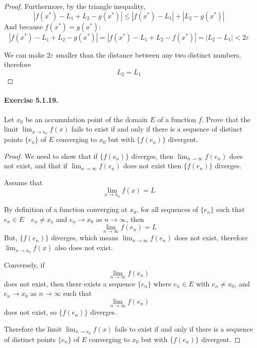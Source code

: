 \documentclass[11pt]{article}
\def \epsilon {\varepsilon}
\newcommand{\set}[1]{\{#1\}}
\def \limittoinfyn {\lim_{n \to \infty}}
\def \limitToXZero {\lim_{x \to x_0}}
\def \sn {s_n}
\def \tn {t_n}
\def \en {e_n}
\begin{document}
\begin{enumerate}[label=(\alph*)]
\begin{proof}
		Furthermore, by the triangle inequality, 
		$$|f(x^*) - L_1 + L_2 - g(x^*)| \leq |f(x^*) - L_1| + |L_2 - g(x^*)|$$
		And because $ f(x^*) = g(x^*) $:
		$$|f(x^*) - L_1 + L_2 - g(x^*)| = |f(x^*) - L_1 + L_2 - f(x^*)| = | L_2 - L_1 | < 2\epsilon$$
		
		We can make $ 2\epsilon $ smaller than the distance between any two distinct numbers, therefore $$ L_2 = L_1 $$
	
					
%		
	\end{proof}

\end{enumerate}

\paragraph{Exercise 5.1.19.} Let $x_0$ be an accumulation point of the domain $E$ of a function $f$.
Prove that the limit $\lim_{x \rightarrow x_0} f(x)$ fails to exist if and only if there is a sequence of distinct points $\{e_n\}$ of $E$ converging to $x_0$ but with $ \set{ f(\en) } $ divergent.

\begin{proof}
	
	We need to show that if $ \set{ f(\en)} $ diverges, then $\limittoinfyn f(\en)$ does not exist, and that if $\limittoinfyn f(\en)$ does not exist then $ \set{ f(\en)} $ diverges.
	
	
	Assume that $$ \limitToXZero f(x) = L $$
	
	By definition of a function converging at $ x_0 $, for all sequences of $ \set{\en} $ such that $ \en \in E \quad \en \ne x_o $ and $ \en \to x_0 $ as $ n \to \infty $, then 
		$$ \limittoinfyn f(\en) = L$$
	But, $ \set{f(\en)} $ diverges, which means $ \limittoinfyn f(\en) $ does not exist, therefore $\limitToXZero f(x)$ also does not exist.
	
	Conversely, if $$ \limittoinfyn f(\en) $$ does not exist, then there exists a sequence $ \set{\en} $ where $ \en \in E $ with $ \en \ne x_0 $, and $ \en \to x_0 $ as $ n \to \infty $ such that $$ \limittoinfyn f(\en) $$ does not exist, so $ \set{ f(\en)} $ diverges.	
	
	Therefore the limit $\lim_{x \rightarrow x_0} f(x)$ fails to exist if and only if there is a sequence of distinct points $\{e_n\}$ of $E$ converging to $x_0$ but with $ \set{ f(\en) } $ divergent.

\end{proof}
\end{document}
